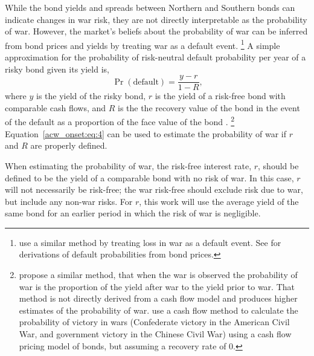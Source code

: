 While the bond yields and spreads between Northern and Southern bonds can indicate changes in war risk, they are not directly interpretable as the probability of war.
However, the market's beliefs about the probability of war can be inferred from bond prices and yields by treating war as a default event.%
\footnote{
  \textcite{HaberMitchenerOosterlinckEtAl2015} use a similar method by treating loss in war as a default event. 
  See \textcites{Fons1987}{Merrick2001}{Chan-Lau2006} for derivations of default probabilities from bond prices.
}
A simple approximation for the probability of risk-neutral default probability per year of a risky bond given its yield is,
\begin{equation}
  \label{acw_onset:eq:4}
  \Pr(\text{default}) = \frac{y - r}{1 - R} \text{,}
\end{equation}
where $y$ is the yield of the risky bond, $r$ is the yield of a risk-free bond with comparable cash flows, and $R$ is the the recovery value of the bond in the event of the default as a proportion of the face value of the bond \parencite{HullPredescuWhite2004}.%
\footnote{\textcite[115]{WaldenstromFrey2008} propose a similar method, that when the war is observed the probability of war is the proportion of the yield after war to the yield prior to war.
  That method is not directly derived from a cash flow model and produces higher estimates of the probability of war.
  \textcite{HaberMitchenerOosterlinckEtAl2015} use a cash flow method to calculate the probability of victory in wars (Confederate victory in the American Civil War, and government victory in the Chinese Civil War) using a cash flow pricing model of bonds, but assuming a recovery rate of 0.
}
Equation~\eqref{acw_onset:eq:4} can be used to estimate the probability of war if $r$ and $R$ are properly defined.

When estimating the probability of war, the risk-free interest rate, $r$, should be defined to be the yield of a comparable bond with no risk of war.
In this case, $r$ will not necessarily be risk-free; the war risk-free should exclude risk due to war, but include any non-war risks.
For $r$, this work will use the average yield of the same bond for an earlier period in which the risk of war is negligible.

